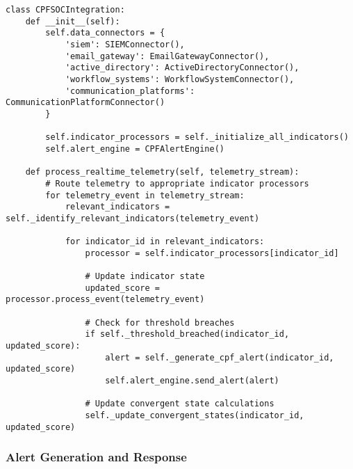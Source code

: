 \documentclass[11pt, onecolumn]{article}
\begin{document}
\begin{lstlisting}
class CPFSOCIntegration:
    def __init__(self):
        self.data_connectors = {
            'siem': SIEMConnector(),
            'email_gateway': EmailGatewayConnector(),
            'active_directory': ActiveDirectoryConnector(),
            'workflow_systems': WorkflowSystemConnector(),
            'communication_platforms': CommunicationPlatformConnector()
        }
        
        self.indicator_processors = self._initialize_all_indicators()
        self.alert_engine = CPFAlertEngine()
        
    def process_realtime_telemetry(self, telemetry_stream):
        # Route telemetry to appropriate indicator processors
        for telemetry_event in telemetry_stream:
            relevant_indicators = self._identify_relevant_indicators(telemetry_event)
            
            for indicator_id in relevant_indicators:
                processor = self.indicator_processors[indicator_id]
                
                # Update indicator state
                updated_score = processor.process_event(telemetry_event)
                
                # Check for threshold breaches
                if self._threshold_breached(indicator_id, updated_score):
                    alert = self._generate_cpf_alert(indicator_id, updated_score)
                    self.alert_engine.send_alert(alert)
                
                # Update convergent state calculations
                self._update_convergent_states(indicator_id, updated_score)
\end{lstlisting}

\subsubsection{Alert Generation and Response}
\end{document}

